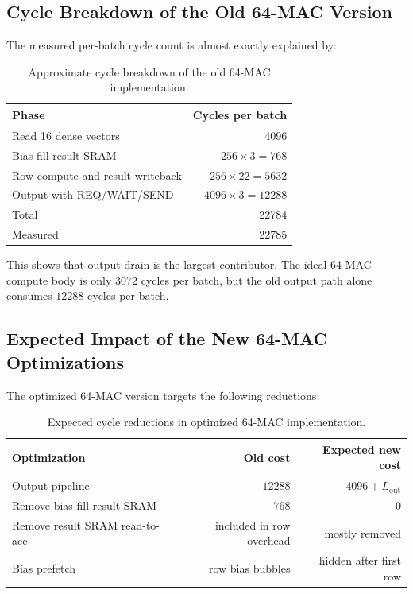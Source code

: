 \documentclass[11pt,a4paper]{article}
\begin{document}
\subsection{Cycle Breakdown of the Old 64-MAC Version}

The measured per-batch cycle count is almost exactly explained by:

\begin{table}[H]
\centering
\caption{Approximate cycle breakdown of the old 64-MAC implementation.}
\begin{tabular}{lr}
\toprule
Phase & Cycles per batch \\
\midrule
Read 16 dense vectors & 4096 \\
Bias-fill result SRAM & $256 \times 3 = 768$ \\
Row compute and result writeback & $256 \times 22 = 5632$ \\
Output with REQ/WAIT/SEND & $4096 \times 3 = 12288$ \\
\midrule
Total & 22784 \\
Measured & 22785 \\
\bottomrule
\end{tabular}
\end{table}

This shows that output drain is the largest contributor. The ideal 64-MAC compute body is only $3072$ cycles per batch, but the old output path alone consumes $12288$ cycles per batch.

\subsection{Expected Impact of the New 64-MAC Optimizations}

The optimized 64-MAC version targets the following reductions:

\begin{table}[H]
\centering
\caption{Expected cycle reductions in optimized 64-MAC implementation.}
\begin{tabular}{lrr}
\toprule
Optimization & Old cost & Expected new cost \\
\midrule
Output pipeline & $12288$ & $4096 + L_{\mathrm{out}}$ \\
Remove bias-fill result SRAM & $768$ & $0$ \\
Remove result SRAM read-to-acc & included in row overhead & mostly removed \\
Bias prefetch & row bias bubbles & hidden after first row \\
\bottomrule
\end{tabular}
\end{table}
\end{document}
